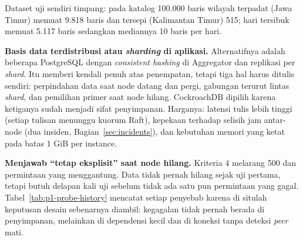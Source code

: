 \documentclass{fairmeta}
\newcommand{\en}[1]{\textit{#1}}
\begin{document}
Dataset uji sendiri timpang: pada katalog 100.000 baris wilayah terpadat (Jawa Timur) memuat 9.818 baris dan tersepi (Kalimantan Timur) 515; hari tersibuk memuat 5.117 baris sedangkan mediannya 10 baris per hari.

\textbf{Basis data terdistribusi atau \en{sharding} di aplikasi.} Alternatifnya adalah beberapa PostgreSQL dengan \en{consistent hashing} di Aggregator dan replikasi per \en{shard}. Itu memberi kendali penuh atas penempatan, tetapi tiga hal harus ditulis sendiri: perpindahan data saat node datang dan pergi, gabungan terurut lintas \en{shard}, dan pemilihan primer saat node hilang. CockroachDB dipilih karena ketiganya sudah menjadi sifat penyimpanan. Harganya: latensi tulis lebih tinggi (setiap tulisan menunggu kuorum Raft), kepekaan terhadap selisih jam antar-node (dua insiden, Bagian~\ref{sec:incidents}), dan kebutuhan memori yang ketat pada batas 1 GiB per instance.

\textbf{Menjawab ``tetap eksplisit'' saat node hilang.} Kriteria 4 melarang 500 dan permintaan yang menggantung. Data tidak pernah hilang sejak uji pertama, tetapi butuh delapan kali uji sebelum tidak ada satu pun permintaan yang gagal. Tabel~\ref{tab:p1-probe-history} mencatat setiap penyebab karena di situlah keputusan desain sebenarnya diambil: kegagalan tidak pernah berada di penyimpanan, melainkan di dependensi kecil dan di koneksi tanpa deteksi \en{peer} mati.
\end{document}
